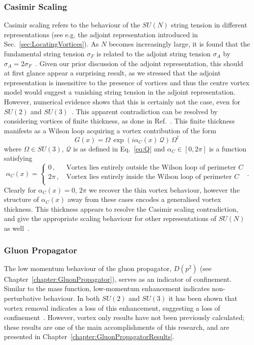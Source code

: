 \subsubsection{Casimir Scaling}
Casimir scaling refers to the behaviour of the $SU(N)$ string tension in different representations (see e.g. the adjoint representation introduced in Sec.~\ref{sec:LocatingVortices}). As $N$ becomes increasingly large, it is found that the fundamental string tension $\sigma_F$ is related to the adjoint string tension $\sigma_A$ by $\sigma_A = 2\sigma_F$~\cite{Greensite:1982be}. Given our prior discussion of the adjoint representation, this should at first glance appear a surprising result, as we stressed that the adjoint representation is insensitive to the presence of vortices and thus the centre vortex model would suggest a vanishing string tension in the adjoint representation. However, numerical evidence shows that this is certainly not the case, even for $SU(2)$ and $SU(3)$~\cite{Ambjorn:1984mb,Ambjorn:1984dp,Campbell:1985kp}. This apparent contradiction can be resolved by considering vortices of finite thickness, as done in Ref.~\cite{Faber:1997rp}. This finite thickness manifests as a Wilson loop acquiring a vortex contribution of the form
%
\begin{equation}
G(x) = \Omega\,\exp\left(i \alpha_C(x)\,\mathcal{Q}\right)\, \Omega^\dagger\,
\end{equation}
%
where $\Omega\in SU(3)$, $\mathcal{Q}$ is as defined in Eq.~\eqref{eq:Q} and $\alpha_C\in [0,2\pi]$ is a function satisfying
%
\begin{equation}
\alpha_C(x)=
\begin{cases}
0\, , &\, \text{Vortex lies entirely outside the Wilson loop of perimeter $C$}\\
2\pi\, , &\, \text{Vortex lies entirely inside the Wilson loop of perimeter $C$}\\
\end{cases}\, .
\end{equation}
%
Clearly for $\alpha_C(x) = 0,\,2\pi$ we recover the thin vortex behaviour, however the structure of $\alpha_C(x)$ away from these cases encodes a generalised vortex thickness. This thickness appears to resolve the Casimir scaling contradiction, and give the appropriate scaling behaviour for other representations of $SU(N)$ as well~\cite{Faber:1997rp}.

\subsubsection{Gluon Propagator}
The low momentum behaviour of the gluon propagator, $D(p^2)$ (see Chapter~\ref{chapter:GluonPropagator}), serves as an indicator of confinement. Similar to the mass function, low-momentum enhancement indicates non-perturbative behaviour. In both $SU(2)$ and $SU(3)$ it has been shown that vortex removal indicates a loss of this enhancement, suggesting a loss of confinement~\cite{Bowman:2010zr,Langfeld:2001cz,Quandt:2010yq}. However, vortex only results have not been previously calculated; these results are one of the main accomplishments of this research, and are presented in Chapter~\ref{chapter:GluonPropagatorResults}.

